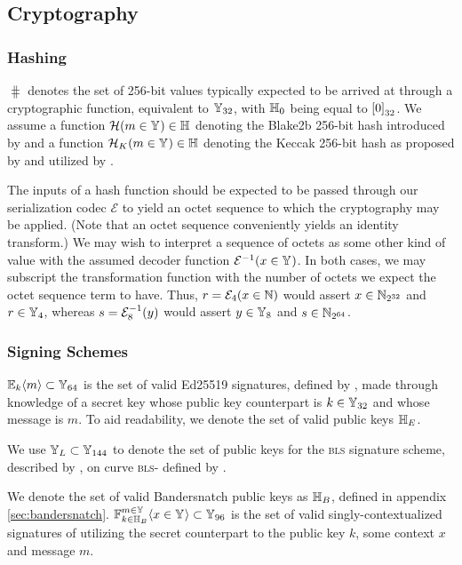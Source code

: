\subsection{Cryptography}\label{sec:cryptography}

\subsubsection{Hashing}

$\hash$ denotes the set of 256-bit values typically expected to be arrived at through a cryptographic function, equivalent to $\blob[32]$, with $\zerohash$ being equal to $\sq{0}_{32}$. We assume a function $\blake{m \in \blob} \in \hash$ denoting the Blake2b 256-bit hash introduced by \cite{rfc7693} and a function $\keccak{m \in \blob} \in \hash$ denoting the Keccak 256-bit hash as proposed by \cite{bertoni2013keccak} and utilized by \cite{wood2014ethereum}.

The inputs of a hash function should be expected to be passed through our serialization codec $\mathcal{E}$ to yield an octet sequence to which the cryptography may be applied. (Note that an octet sequence conveniently yields an identity transform.) We may wish to interpret a sequence of octets as some other kind of value with the assumed decoder function $\decode{x \in \blob}$. In both cases, we may subscript the transformation function with the number of octets we expect the octet sequence term to have. Thus, $r = \mathcal{E}_4(x \in \N)$ would assert $x \in \Nbits{32}$ and $r \in \blob[4]$, whereas $s = \decode[8]{y}$ would assert $y \in \blob[8]$ and $s \in \Nbits{64}$.

\subsubsection{Signing Schemes}\label{sec:signing}

$\sig{k}{m} \subset \blob[64]$ is the set of valid Ed25519 signatures, defined by \cite{rfc8032}, made through knowledge of a secret key whose public key counterpart is $k \in \blob[32]$ and whose message is $m$. To aid readability, we denote the set of valid public keys $\edkey$.

We use $\blskey \subset \blob[144]$ to denote the set of public keys for the \textsc{bls} signature scheme, described by \cite{jofc-2004-14130}, on curve \textsc{bls}- defined by \cite{bls12-381}.

We denote the set of valid Bandersnatch public keys as $\bskey$, defined in appendix \ref{sec:bandersnatch}. $\bandersig{k \in \bskey}{x \in \blob}{m \in \blob} \subset \blob[96]$ is the set of valid singly-contextualized signatures of utilizing the secret counterpart to the public key $k$, some context $x$ and message $m$.

